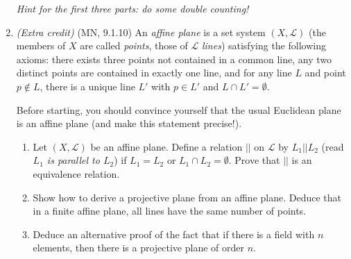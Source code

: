 \documentclass{amsart}
\theoremstyle{definition}
\newcommand{\Ls}{\mathcal{L}}
\begin{document}
\begin{enumerate}
  \emph{Hint for the first three parts: do some double counting!}
\item  \emph{(Extra credit)}  (MN, 9.1.10) An \emph{affine plane} is a set system $(X, \Ls)$ (the members of $X$ are called \emph{points}, those of $\Ls$ \emph{lines}) satisfying the following axioms: there exists three points not contained in a common line, any two distinct points are contained in exactly one line, and for any line $L$ and point $p \notin L$, there is a unique line $L'$ with $p \in L'$ and $L \cap L' = \emptyset$.

  Before starting, you should convince yourself that the usual Euclidean plane is an affine plane (and make this statement precise!).

  \begin{enumerate}
  \item Let $(X, \Ls)$ be an affine plane. Define a relation $||$ on $\Ls$ by $L_1 || L_2$ (read \emph{$L_1$ is parallel to $L_2$}) if $L_1 = L_2$ or $L_1 \cap L_2 = \emptyset$. Prove that $||$ is an equivalence relation.
  \item Show how to derive a projective plane from an affine plane. Deduce that in a finite affine plane, all lines have the same number of points.
  \item Deduce an alternative proof of the fact that if there is a field with $n$ elements, then there is a projective plane of order $n$.
  \end{enumerate}
\end{enumerate}
\end{document}
